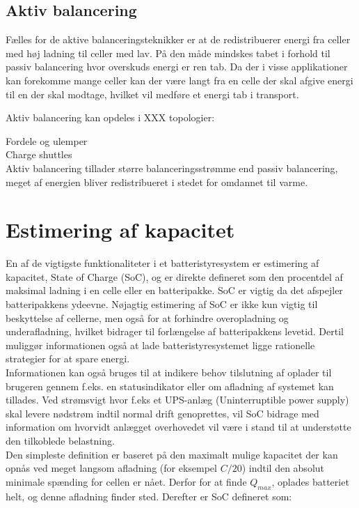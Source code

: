 \subsection{Aktiv balancering}
Fælles for de aktive balanceringsteknikker er at de redistribuerer energi fra celler med høj ladning til celler med lav. På den måde mindskes tabet i forhold til passiv balancering hvor overskuds energi er ren tab. Da der i visse applikationer kan forekomme mange celler kan der være langt fra en celle der skal afgive energi til en der skal modtage, hvilket vil medføre et energi tab i transport.

Aktiv balancering kan opdeles i XXX topologier:

Fordele og ulemper
\\

Charge shuttles
\\

Aktiv balancering tillader større balanceringsstrømme end passiv balancering, meget af energien bliver redistribueret i stedet for omdannet til varme.

\section{Estimering af kapacitet}
En af de vigtigste funktionaliteter i et batteristyresystem er estimering af kapacitet, State of Charge (SoC), og er direkte defineret som den procentdel af maksimal ladning i en celle eller en batteripakke. SoC er vigtig da det afspejler batteripakkens ydeevne. Nøjagtig estimering af SoC er ikke kun vigtig til beskyttelse af cellerne, men også for at forhindre overopladning og underafladning, hvilket bidrager til forlængelse af batteripakkens levetid. Dertil muliggør informationen også at lade batteristyresystemet ligge rationelle strategier for at spare energi. \\

Informationen kan også bruges til at indikere behov tilslutning af oplader til brugeren gennem f.eks. en statusindikator eller om afladning af systemet kan tillades. 
Ved strømsvigt hvor f.eks et UPS-anlæg (Uninterruptible power supply) skal levere nødstrøm indtil normal drift genoprettes, vil SoC bidrage med information om hvorvidt anlægget overhovedet vil være i stand til at understøtte den tilkoblede belastning. \\

Den simpleste definition er baseret på den maximalt mulige kapacitet der kan opnås ved meget langsom afladning (for eksempel $C/20$) indtil den absolut minimale spænding for cellen er nået. Derfor for at finde $Q_{max}$, oplades batteriet helt, og denne afladning finder sted. Derefter er SoC defineret som: 


